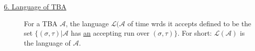 \begin{tcolorbox}[colback=kapiteleins!5!white, colframe=orange!75!black, title=\textbf{Timed Büchi Automata $\mathcal{A} = \left( \Sigma, S, S_0, X, E, F \right)$}, left=0mm, right=0mm, top=0mm, bottom=0mm]
\begin{description}
\item[\uline{6. Language of TBA}] For a TBA $\mathcal{A}$, the language $\mathcal{L}(\mathcal{A}$ of time wrds it accepts defined to be the set $\{(\sigma, \tau) \vert \mathcal{A}$ has \uline{an} accepting run over $(\sigma, \tau) \}$. For short: $\mathcal{L}(\mathcal{A})$ is the language of $\mathcal{A}$.
\end{description}
\end{tcolorbox}

